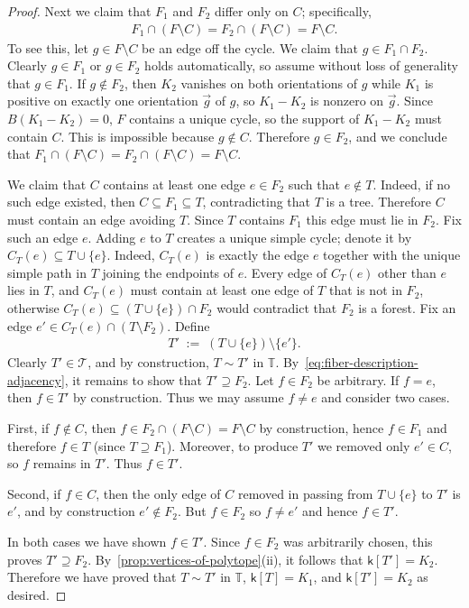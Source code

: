 \documentclass[11pt,a4paper]{article}
\newcommand{\setoftrees}{{\mathcal{T}}}
\newcommand{\stategraph}{{\mathbb{T}}}
\newcommand{\embedding}{{\mathsf{k}}}
\begin{document}
\begin{proof}
        Next we claim that $F_1$ and $F_2$ differ only on $C$; specifically,
            \begin{align*}
                F_1\cap(F\setminus C) = F_2\cap(F\setminus C) = F\setminus C.
            \end{align*}
        To see this, let $g\in F\setminus C$ be an edge off the cycle. We claim that $g\in F_1\cap F_2$. Clearly $g\in F_1$ or $g\in F_2$ holds automatically, so assume without loss of generality that $g\in F_1$. If $g\notin F_2$, then $K_2$ vanishes on both orientations of $g$ while $K_1$ is positive on exactly one orientation $\overrightarrow{g}$ of $g$, so $K_1-K_2$ is nonzero on $\overrightarrow{g}$. Since $B(K_1-K_2)=0$, $F$ contains a unique cycle, so the support of $K_1-K_2$ must contain $C$. This is impossible because $g\notin C$. Therefore $g\in F_2$, and we conclude that $F_1\cap(F\setminus C) = F_2\cap(F\setminus C) = F\setminus C$.

        We claim that $C$ contains at least one edge $e\in F_2$ such that $e\notin T$. Indeed, if no such edge existed, then $C\subseteq F_1\subseteq T$, contradicting that $T$ is a tree. Therefore $C$ must contain an edge avoiding $T$. Since $T$ contains $F_1$ this edge must lie in $F_2$. Fix such an edge $e$. Adding $e$ to $T$ creates a unique simple cycle; denote it by $C_T(e)\subseteq T\cup\{e\}$. Indeed, $C_T(e)$ is exactly the edge $e$ together with the unique simple path in $T$ joining the endpoints of $e$. Every edge of $C_T(e)$ other than $e$ lies in $T$, and $C_T(e)$ must contain at least one edge of $T$ that is not in $F_2$, otherwise $C_T(e)\subseteq (T\cup\{e\})\cap F_2$ would contradict that $F_2$ is a forest. Fix an edge $e'\in C_T(e) \cap (T\setminus F_2)$. Define
            \begin{align*}
                T' \;:=\; (T\cup\{e\})\setminus\{e'\}.
            \end{align*}
        Clearly $T'\in\setoftrees$, and by construction, $T\sim T'$ in $\stategraph$. By~\eqref{eq:fiber-description-adjacency}, it remains to show that $T'\supseteq F_2$. Let $f\in F_2$ be arbitrary. If $f=e$, then $f\in T'$ by construction. Thus we may assume $f\neq e$ and consider two cases.
        
        First, if $f\notin C$, then $f\in F_2\cap(F\setminus C)=F\setminus C$ by construction, hence $f\in F_1$ and therefore $f\in T$ (since $T\supseteq F_1$). Moreover, to produce $T'$ we removed only $e'\in C$, so $f$ remains in $T'$. Thus $f\in T'$.
        
        Second, if $f\in C$, then the only edge of $C$ removed in passing from $T\cup\{e\}$ to $T'$ is $e'$, and by construction $e'\notin F_2$. But $f\in F_2$ so $f\neq e'$ and hence $f\in T'$.

        In both cases we have shown $f\in T'$. Since $f\in F_2$ was arbitrarily chosen, this proves $T'\supseteq F_2$. By~\cref{prop:vertices-of-polytope}(ii), it follows that $\embedding[T']=K_2$. Therefore we have proved that $T\sim T'$ in $\stategraph$, $\embedding[T]=K_1$, and $\embedding[T']=K_2$ as desired.
    \end{proof}
\end{document}
